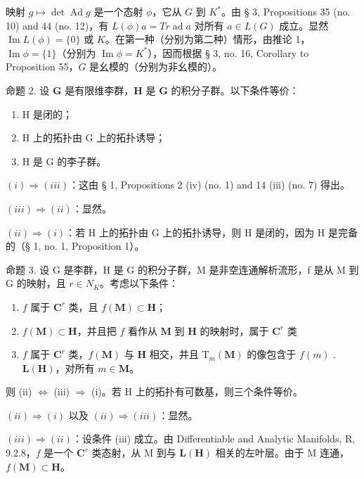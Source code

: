 映射 \(g \mapsto \operatorname{det} \operatorname{Ad} g\) 是一个态射 \(\phi\)，它从 \(G\) 到 \(K^*\)。由 § 3, Propositions 35 (no. 10) and 44 (no. 12)，有 \(L(\phi)a = Tr\operatorname{ad} a\) 对所有 \(a \in L(G)\) 成立。显然 \(\operatorname{Im} L(\phi) = \{0\}\) 或 \(K\)。在第一种（分别为第二种）情形，由推论 1，\(\operatorname{Im} \phi = \{1\}\)（分别为 \(\operatorname{Im} \phi = K^*\)），因而根据 § 3, no. 16, Corollary to Proposition 55，\(G\) 是幺模的（分别为非幺模的）。

命题 2. 设 \(\mathbf{G}\) 是有限维李群，\(\mathbf{H}\) 是 \(\mathbf{G}\) 的积分子群。以下条件等价：

\begin{enumerate}
\def\labelenumi{(\roman{enumi})}
\item
  H 是闭的；
\item
  H 上的拓扑由 G 上的拓扑诱导；
\item
  H 是 G 的李子群。
\end{enumerate}

\((i) \Rightarrow (iii)\)：这由 § 1, Propositions 2 (iv) (no. 1) and 14 (iii) (no. 7) 得出。

\((iii) \Rightarrow (ii)\)：显然。

\((ii) \Rightarrow (i)\)：若 H 上的拓扑由 G 上的拓扑诱导，则 H 是闭的，因为 H 是完备的（§ 1, no. 1, Proposition 1）。

命题 3. 设 G 是李群，H 是 G 的积分子群，M 是非空连通解析流形，f 是从 M 到 G 的映射，且 \(r \in N_{K}\)。考虑以下条件：

\begin{enumerate}
\def\labelenumi{(\roman{enumi})}
\item
  \(f\) 属于 \(\mathbf{C}^r\) 类，且 \(f(\mathbf{M})\subset \mathbf{H}\)；
\item
  \(f(\mathbf{M})\subset \mathbf{H}\)，并且把 \(f\) 看作从 \(\mathbf{M}\) 到 \(\mathbf{H}\) 的映射时，属于 \(\mathbf{C}^r\) 类
\item
  \(f\) 属于 \(\mathbf{C}^r\) 类，\(f(\mathbf{M})\) 与 \(\mathbf{H}\) 相交，并且 \(\mathrm{T}_m(\mathbf{M})\) 的像包含于 \(f(m)\) . \(\mathbf{L}(\mathbf{H})\)，对所有 \(m \in \mathbf{M}\)。
\end{enumerate}

则 (ii) \(\Leftrightarrow\) (iii) \(\Rightarrow\) (i)。若 H 上的拓扑有可数基，则三个条件等价。

\((ii) \Rightarrow (i)\) 以及 \((ii) \Rightarrow (iii)\)：显然。

\((iii) \Rightarrow (ii)\)：设条件 (iii) 成立。由 Differentiable and Analytic Manifolds, R, 9.2.8，\(f\) 是一个 \(\mathbf{C}^r\) 类态射，从 M 到与 \(\mathbf{L}(\mathbf{H})\) 相关的左叶层。由于 M 连通，\(f(\mathbf{M}) \subset \mathbf{H}\)。

